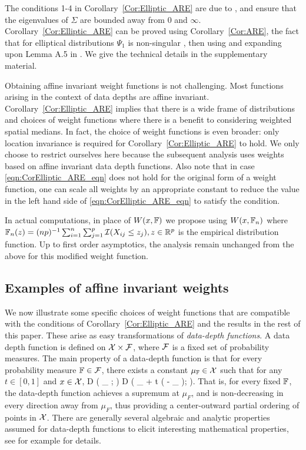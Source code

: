 The conditions 1-4 in Corollary~\ref{Cor:Elliptic_ARE} are due to \cite{ref:JASA151658_WangPengLi}, and ensure that the eigenvalues of $\Sigma$ are bounded away from 0 and $\infty$. Corollary~\ref{Cor:Elliptic_ARE} can be proved using Corollary~\ref{Cor:ARE}, the fact that for elliptical distributions $\Psi_1$ is non-singular \cite{ref:SPL12765_Taskinenetal}, then using and expanding upon Lemma A.5 in \cite{ref:JASA151658_WangPengLi}. We give the technical details in the supplementary material.

Obtaining affine invariant weight functions is not challenging. Most functions arising in the context of data depths are affine invariant. Corollary~\ref{Cor:Elliptic_ARE} implies that there is a wide frame of distributions and  choices of weight functions where there is a benefit to considering weighted spatial medians. In fact, the choice of weight functions is even broader: only location invariance is required for Corollary~\ref{Cor:Elliptic_ARE} to hold. We only choose to restrict ourselves here because the subsequent analysis uses weights based on affine invariant data depth functions. Also note that in case \eqref{eqn:CorElliptic_ARE_eqn} does not hold for the original form of a weight function, one can scale all weights by an appropriate constant to reduce the value in the left hand side of \eqref{eqn:CorElliptic_ARE_eqn} to satisfy the condition.

In actual computations, in place of $W (x, {\mathbb{F}})$ we propose using $W (x, {\mathbb{F}}_{n})$ where
$ {\mathbb{F}}_{n}(z) = (np)^{-1} \sum_{i = 1}^{n} \sum_{j=1}^p
\mathcal{I} (X_{ij} \leq z_j ), z \in {\mathbb{R}}^p
$ is the empirical distribution function. Up to first order asymptotics, the analysis remain unchanged from the above for this modified weight function.

\subsection{Examples of affine invariant weights}

We now illustrate some specific choices of weight functions that are compatible with the 
conditions of Corollary~\ref{Cor:Elliptic_ARE} and the results in the rest of this paper.
 These arise as easy transformations 
of \textit{data-depth functions}. A data depth function 
is defined on $\mathcal{X} \times \mathcal{F}$, where $\mathcal{F}$ is  a fixed set of probability measures.
The main property of a data-depth function is that for every probability measure 
${\mathbb{F}} \in \mathcal{F}$, there exists a constant 
$\mu_{{\mathbb{F}}} \in  \mathcal{X}$ such that for any $t \in [ 0, 1]$ and $x \in \mathcal{X}$,
\baq 
D ( \mu_{\BF} ; \BF ) \geq D ( \mu_{\BF} + t ( \bfx - \mu_{\BF} ); \BF ). 
\label{eq:Peripherality}
\eaq
That is, for every fixed ${\mathbb{F}}$, the data-depth function achieves a supremum at 
$\mu_{F}$, and is non-decreasing in every direction away from $\mu_{F}$, thus providing 
a  center-outward partial ordering of points in $\mathcal{X}$. There are generally several 
algebraic and analytic properties assumed for data-depth functions to elicit interesting 
mathematical properties, see for example \cite{ref:DIMACS061_Serfling, ref:AoS00461_ZuoSerfling} for details.


